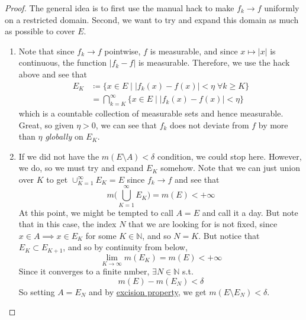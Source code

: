   \begin{proof}
    The general idea is to first use the manual hack to make $f_k \to f$ uniformly on a restricted domain. Second, we want to try and expand this domain as much as possible to cover $E$. 
    \begin{enumerate}
      \item Note that since $f_k \to f$ pointwise, $f$ is measurable, and since $x \mapsto |x|$ is continuous, the function $|f_k - f|$ is measurable. Therefore, we use the hack above and see that 
      \begin{align}
        E_K & \coloneqq \{ x \in E \mid |f_k (x) - f(x)| < \eta \; \forall k \geq K \} \\ 
            & = \bigcap_{k=K}^\infty \{x \in E \mid |f_k (x) - f(x)| < \eta \}
      \end{align}
      which is a countable collection of measurable sets and hence measurable. Great, so given $\eta > 0$, we can see that $f_k$ does not deviate from $f$ by more than $\eta$ \textit{globally} on $E_K$. 

      \item If we did not have the $m(E \setminus A) < \delta$ condition, we could stop here. However, we do, so we must try and expand $E_K$ somehow. Note that we can just union over $K$ to get $\cup_{K=1}^\infty E_K = E$ since $f_k \to f$ and see that 
      \begin{equation}
        m \bigg( \bigcup_{K=1}^\infty E_K \bigg) = m(E) < +\infty
      \end{equation}
      At this point, we might be tempted to call $A = E$ and call it a day. But note that in this case, the index $N$ that we are looking for is not fixed, since $x \in A \implies x \in E_K$ for some $K \in \mathbb{N}$, and so $N = K$. But notice that $E_K \subset E_{K+1}$, and so by continuity from below, 
      \begin{equation}
        \lim_{K \to \infty} m(E_K) = m(E) < +\infty
      \end{equation}
      Since it converges to a finite nmber, $\exists N \in \mathbb{N}$ s.t. 
      \begin{equation}
        m(E) - m(E_N) < \delta
      \end{equation}
      So setting $A = E_N$ and by \hyperref[thm:excision-property]{excision property}, we get $m(E \setminus E_N) < \delta$. 
    \end{enumerate}
  \end{proof}



